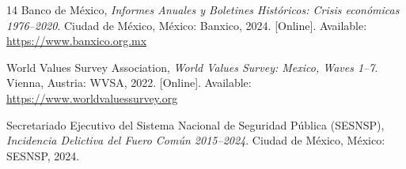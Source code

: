 \documentclass[conference,spanish]{IEEEtran}
\begin{document}
\begin{thebibliography}{14}
Banco de México, \textit{Informes Anuales y Boletines Históricos: Crisis económicas 1976--2020}. Ciudad de México, México: Banxico, 2024. [Online]. Available: \url{https://www.banxico.org.mx}

World Values Survey Association, \textit{World Values Survey: Mexico, Waves 1--7}. Vienna, Austria: WVSA, 2022. [Online]. Available: \url{https://www.worldvaluessurvey.org}

Secretariado Ejecutivo del Sistema Nacional de Seguridad Pública (SESNSP), \textit{Incidencia Delictiva del Fuero Común 2015--2024}. Ciudad de México, México: SESNSP, 2024.

\end{thebibliography}
\end{document}
